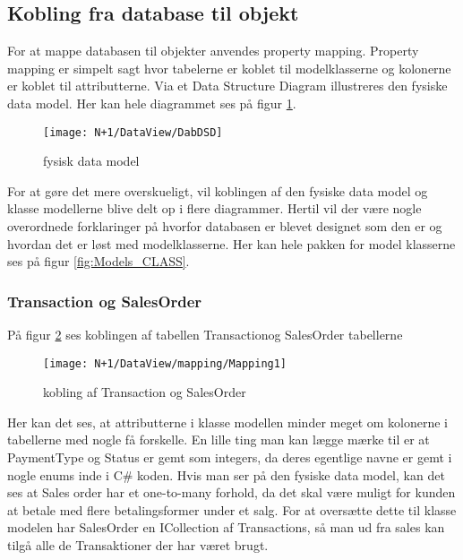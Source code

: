 \subsection{Kobling fra database til objekt}
For at mappe databasen til objekter anvendes property mapping. Property mapping er simpelt sagt hvor tabelerne er koblet til modelklasserne og kolonerne er koblet til attributterne. Via et Data Structure Diagram illustreres den fysiske data model. Her kan hele diagrammet ses på figur \ref{fig:DSD}.

\begin{figure}[H]
    \centering
    \texttt{[image: N+1/DataView/DabDSD]}
    \caption{fysisk data model}
    \label{fig:DSD}
\end{figure}

For at gøre det mere overskueligt, vil koblingen af den fysiske data model og klasse modellerne blive delt op i flere diagrammer. Hertil vil der være nogle overordnede forklaringer på hvorfor databasen er blevet designet som den er og hvordan det er løst med modelklasserne. Her kan hele pakken for model klasserne ses på figur \ref{fig:Models_CLASS}.

\subsubsection{Transaction og SalesOrder}
På figur \ref{fig:Mapping_TS} ses koblingen af tabellen Transactionog SalesOrder tabellerne

\begin{figure}[H]
    \centering
    \texttt{[image: N+1/DataView/mapping/Mapping1]}
    \caption{kobling af Transaction og SalesOrder}
    \label{fig:Mapping_TS}
\end{figure}

Her kan det ses, at attributterne i klasse modellen minder meget om kolonerne i tabellerne med nogle få forskelle. En lille ting man kan lægge mærke til er at PaymentType og Status er gemt som integers, da deres egentlige navne er gemt i nogle enums inde i C\# koden. 
\newline\newline
Hvis man ser på den fysiske data model, kan det ses at Sales order har et one-to-many forhold, da det skal være muligt for kunden at betale med flere betalingsformer under et salg. For at oversætte dette til klasse modelen har SalesOrder en ICollection af Transactions, så man ud fra sales kan tilgå alle de Transaktioner der har været brugt. 

